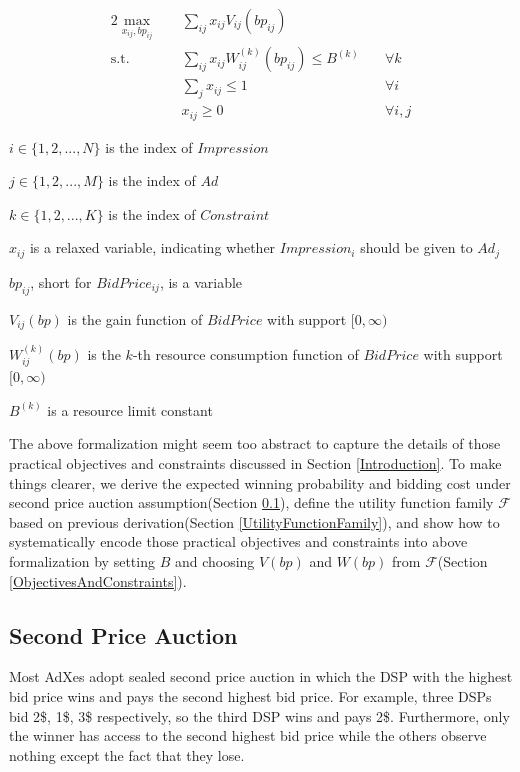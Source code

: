 \documentclass{article}
\newcommand{\sumj}{\sum\limits_j}
\newcommand{\sumij}{\sum\limits_{ij}}
\newcommand{\sx}{x_{ij}}
\newcommand{\sbp}{bp_{ij}}
\newcommand{\sV}{V_{ij}}
\newcommand{\sW}{W_{ij}^{(k)}}
\newcommand{\sB}{B^{(k)}}
\newcommand{\inRange}[1]{\in\{1,2,...,#1\}}
\newcommand{\uff}{\mathscr{F}}
\newcommand{\dspresourceconstraint}{\sumij \sx \sW(\sbp) \le \sB}
\newcommand{\assignmentconstraint}{\sumj \sx \le 1}
\begin{document}
\begin{alignat}{2}
    \max\limits_{\sx, \sbp} \quad & \sumij \sx \sV(\sbp) \quad    & {} \\
    \mbox{s.t.} \quad             & \dspresourceconstraint \quad  & \forall k \\
    \quad                         & \assignmentconstraint \quad   & \forall i \\
    \quad                         & \sx \ge 0 \quad               & \forall i,j
\end{alignat}

$i \inRange{N}$ is the index of $Impression$

$j \inRange{M}$ is the index of $Ad$

$k \inRange{K}$ is the index of $Constraint$

$\sx$ is a relaxed variable, indicating whether $Impression_i$ should be given to $Ad_j$

$\sbp$, short for $BidPrice_{ij}$, is a variable

$\sV(bp)$ is the gain function of $BidPrice$ with support $[0, \infty)$

$\sW(bp)$ is the $k$-th resource consumption function of $BidPrice$ with support $[0, \infty)$

$\sB$ is a resource limit constant

The above formalization might seem too abstract to capture the details of
    those practical objectives and constraints discussed in Section \ref{Introduction}.
To make things clearer, we
    derive the expected winning probability and bidding cost
        under second price auction assumption(Section \ref{SecondPriceAuction}),
    define the utility function family $\uff$ based on previous derivation(Section \ref{UtilityFunctionFamily}),
    and show how to systematically encode those practical objectives and constraints into above formalization
        by setting $B$ and choosing $V(bp)$ and $W(bp)$ from $\uff$(Section \ref{ObjectivesAndConstraints}).

\subsection{Second Price Auction} \label{SecondPriceAuction}

Most AdXes adopt sealed second price auction in which
    the DSP with the highest bid price wins and pays the second highest bid price.
For example, three DSPs bid 2\$, 1\$, 3\$ respectively, so the third DSP wins and pays 2\$. 
Furthermore, only the winner has access to the second highest bid price
    while the others observe nothing except the fact that they lose.
\end{document}
